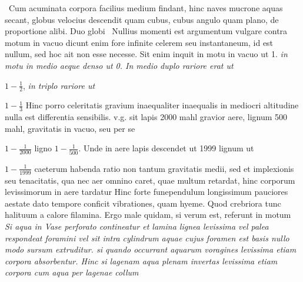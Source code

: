 \pend 
\newpage
\pstart 
{} \, Cum acuminata corpora facilius medium findant, hinc naves\protect{} mucrone aquas secant, globus velocius descendit quam cubus\protect{}, cubus angulo quam plano, de proportione alibi. Duo globi  
\pend
\pstart
{} \, Nullius momenti est argumentum vulgare contra motum in vacuo dicunt enim fore infinite celerem seu instantaneum, id est nullum, sed hoc ait non esse necesse. Sit enim inquit in motu in vacuo ut 1. \textit{in motu in medio aeque denso ut 0. In medio duplo rariore erat ut} 
\rule[-2mm]{0mm}{8mm}$\displaystyle1-\frac{1}{2}$, 
\textit{in triplo rariore ut} 
\rule[-4mm]{0mm}{0mm}$\displaystyle1-\frac{1}{3}$
\textit{}
Hinc porro celeritatis gravium\protect{} inaequaliter inaequalis in mediocri altitudine nulla est differentia sensibilis. v.g. sit lapis 2000 mahl gravior aere,
lignum 500 mahl, gravitatis in vacuo\protect{}, seu per se 
\rule[-2mm]{0mm}{8mm}$\displaystyle1-\frac{1}{2000}$
ligno $\displaystyle1-\frac{1}{500}$.
Unde in aere
lapis descendet ut 1999 lignum ut
\rule[-4mm]{0mm}{0mm}$\displaystyle1-\frac{1}{1999}$
caeterum habenda ratio non tantum gravitatis medii, sed et implexionis seu tenacitatis, qua nec aer
omnino caret, quae multum retardat, hinc corporum levissimorum in aere
tardatur 
Hinc forte funependulum longissimum pauciores aestate\protect{} dato tempore conficit vibrationes\protect{}, quam hyeme\protect{}. Quod crebriora tunc halituum a calore filamina. Ergo male quidam, si verum est, referunt in motum 
\pend 
\pstart
{} \,
\textit{Si aqua in Vase perforato contineatur et lamina lignea levissima vel palea respondeat foramini vel sit intra cylindrum aquae\protect{} cujus foramen est basis nullo modo sursum \textit{extruditur. }
%
\textit{si
quando occurrant aquarum voragines levissima etiam corpora absorbentur. Hinc si lagenam aqua plenam\protect{} invertas levissima etiam corpora cum aqua per lagenae collum} 
} 
